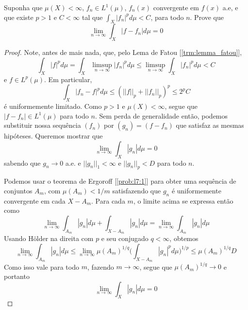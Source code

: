 \begin{problem}
    \label{prob:l7:2}
    Suponha que $\mu(X) < \infty$, $f_n \in L^1(\mu)$, $f_n(x)$ convergente em $f(x)$ a.e, e que existe 
    $p > 1$ e $C < \infty$ tal que $\int_X|f_n|^p d\mu < C$, para todo $n$. Prove que 
    $$\lim_{n\to\infty} \int_X |f - f_n|d\mu = 0$$ 
\end{problem}
\begin{proof}
    Note, antes de mais nada, que, pelo Lema de Fatou [\ref{trm:lemma_fatou}],
    $$\int_X |f|^p d\mu = \int_X \limsup_{n\to\infty} |f_n|^p d\mu \leq \limsup_{n\to\infty} \int_X |f_n|^p d\mu < C$$
    e $f \in L^p(\mu)$.
    Em particular,
    $$\int_{X} |f_n - f|^p d\mu \leq (||f||_p + ||f_n||_p)^p \leq 2^pC$$
    é uniformemente limitado. Como $p > 1$ e $\mu(X) < \infty$, segue que $|f - f_n| \in L^1(\mu)$ para todo $n$.
    Sem perda de generalidade então, podemos substituir nossa sequência $(f_n)$ por $(g_n) = (f - f_n)$ que satisfaz
    as mesmas hipóteses. Queremos mostrar que 
    $$\lim_{n\to\infty} \int_{X} |g_n| d\mu = 0$$
    sabendo que $g_n \to 0$ a.e. e $||g_n||_1 < \infty$ e $||g_n||_p < D$ para todo $n$. 
    
    Podemos usar o teorema de Ergoroff [\ref{prob:l7:1}]
    para obter uma sequência de conjuntos $A_m$, com $\mu(A_m) < 1/m$ satisfazendo que $g_n$ é uniformemente convergente em cada $X - A_m$.
    Para cada $m$, o limite acima se expressa então como 
    $$\lim_{n\to\infty}\int_{A_m} |g_n|d\mu + \int_{X - A_m} |g_n|d\mu = \lim_{n\to\infty}\int_{A_m} |g_n|d\mu$$
    Usando Hölder na direita com $p$ e seu conjugado $q < \infty$, obtemos 
    $$\lim_{n\to\infty}\int_{A_m} |g_n|d\mu \leq \lim_{n\to\infty} \mu(A_m)^{1/q}\bigg(\int_{X - A_m} |g_n|^p d\mu\bigg)^{1/p} \leq \mu(A_m)^{1/q}D$$
    Como isso vale para todo $m$, fazendo $m \to \infty$, segue que $\mu(A_m)^{1/q} \to 0$ e portanto 
    $$\lim_{n\to\infty} \int_{X} |g_n| d\mu = 0$$
\end{proof}

